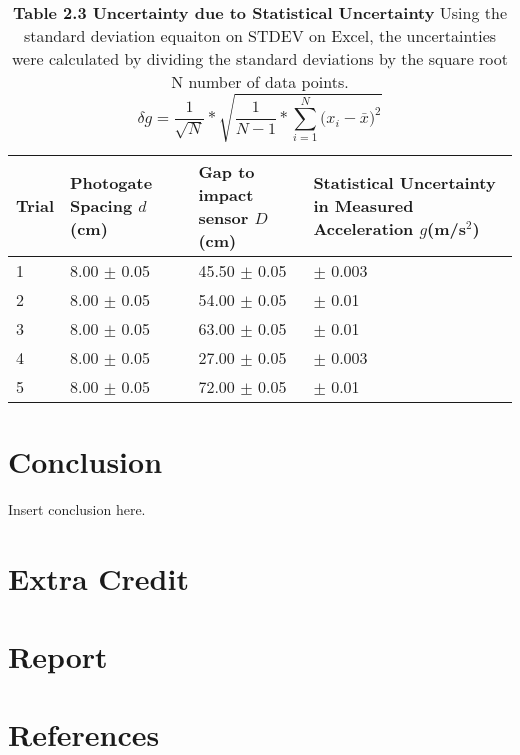 \documentclass[11pt]{report}
\begin{document}
\begin{table}[h]
    \centering
    \begin{tabular}{| p{1cm} | p{4cm} | p{4cm} | p{5cm} |}
        \hline
        Trial & Photogate Spacing \(d\)(cm) & Gap to impact sensor \(D\)(cm) & 
        Statistical Uncertainty in Measured Acceleration \(g\)(m/s$^2$) \\
        \hline
        1 & 8.00 $\pm$ 0.05 & 45.50 $\pm$ 0.05 & $\pm$ 0.003 \\
        \hline
        2 & 8.00 $\pm$ 0.05 & 54.00 $\pm$ 0.05 & $\pm$ 0.01 \\
        \hline
        3 & 8.00 $\pm$ 0.05 & 63.00 $\pm$ 0.05 & $\pm$ 0.01 \\
        \hline
        4 & 8.00 $\pm$ 0.05 & 27.00 $\pm$ 0.05 & $\pm$ 0.003 \\
        \hline
        5 & 8.00 $\pm$ 0.05 & 72.00 $\pm$ 0.05 & $\pm$ 0.01 \\
        \hline 
    \end{tabular}
    \caption*{\textbf{Table 2.3 Uncertainty due to Statistical Uncertainty}
    Using the standard deviation equaiton on STDEV on Excel, the uncertainties
were calculated by dividing the standard deviations by the square root N number
of data points.
\[\delta g = \frac{1}{\sqrt{N}} * \sqrt{\frac{1}{N-1} * \sum\limits_{i=1}^{N} \big(x_i
- \bar{x} \big)^2}\] } 
     
\end{table}


\section*{Conclusion}
Insert conclusion here.

\section*{Extra Credit}

\section*{Report}



\newpage
\section*{References}
\end{document}
